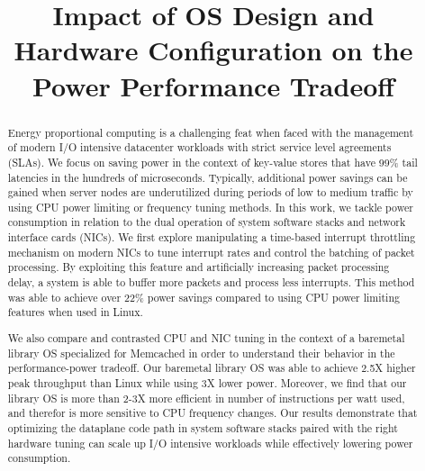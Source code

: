 \documentclass[letterpaper,twocolumn,10pt]{article}
\begin{document}

\date{}


\title{Impact of OS Design and Hardware Configuration on the Power Performance Tradeoff}



 \maketitle


\begin{abstract}
Energy proportional computing is a challenging feat when faced with the management of modern I/O intensive datacenter workloads with strict service level agreements (SLAs). We focus on saving power in the context of key-value stores that have 99\% tail latencies in the hundreds of microseconds. Typically, additional power savings can be gained when server nodes are underutilized during periods of low to medium traffic by using CPU power limiting or frequency tuning methods. In this work, we tackle power consumption in relation to the dual operation of system software stacks and network interface cards (NICs). We first explore manipulating a time-based interrupt throttling mechanism on modern NICs to tune interrupt rates and control the batching of packet processing. By exploiting this feature and artificially increasing packet processing delay, a system is able to buffer more packets and process less interrupts. This method was able to achieve over 22\% power savings  compared to using CPU power limiting features when used in Linux. 

  We also compare and contrasted CPU and NIC tuning in the context of a baremetal library OS specialized for Memcached in order to understand their behavior in the performance-power tradeoff. Our baremetal library OS was able to achieve 2.5X higher peak throughput than Linux while using 3X lower power. Moreover, we find that our library OS is more than 2-3X more efficient in number of instructions per watt used, and therefor is more sensitive to CPU frequency changes. Our results demonstrate that optimizing the dataplane code path in system software stacks paired with the right hardware tuning can scale up I/O intensive workloads while effectively lowering power consumption.
\end{abstract}
\end{document}
